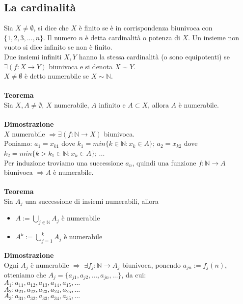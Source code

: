 \documentclass{article}
\begin{document}
\subsection{La cardinalità}
Sia $X \neq \emptyset$, si dice che $X$ è finito se è in corrispondenza biunivoca con $\{1, 2, 3, ..., n\}$. Il numero $n$ è detta cardinalità o potenza di $X$. Un insieme non vuoto si dice infinito se non è finito.\\
Due insiemi infiniti $X,Y$ hanno la stessa cardinalità (o sono equipotenti) se $\exists (f: X \rightarrow Y)$ biunivoca e si denota $X \sim Y$.\\
$X \neq \emptyset$ è detto numerabile se $X \sim \mathds{N}$.\\\\
\textbf{Teorema}\\
Sia $X,A \neq \emptyset$, $X$ numerabile, $A$ infinito e $A \subset X$, allora $A$ è numerabile.\\\\
\textbf{Dimostrazione}\\
$X$ numerabile $\Rightarrow \exists (f: \mathds{N} \rightarrow X)$ biunivoca.\\
Poniamo: $a_1 = x_{k1}$ dove $k_1 = min\{k \in \mathds{N}: x_k \in A\}$; $a_2 = x_{k2}$ dove $k_2 = min\{k>k_1 \in \mathds{N}: x_k \in A\}$; ...\\
Per induzione troviamo una successione $a_n$, quindi una funzione $f: \mathds{N} \rightarrow A$ biunivoca $\Rightarrow A$ è numerabile.\\
\\
\textbf{Teorema}\\
Sia $A_j$ una successione di insiemi numerabili, allora \begin{itemize}
    \item $A:= \bigcup_{j \in \mathds{N}} A_j$ è numerabile
    \item $A^k:= \bigcup_{j = 1} ^k A_j$ è numerabile
\end{itemize}
\textbf{Dimostrazione}\\
Ogni $A_j$ è numerabile $\Rightarrow$ $\exists f_j: \mathds{N} \rightarrow A_j$ biunivoca, ponendo $a_{jn} := f_j(n)$, otteniamo che $A_j = \{a_{j1}, a_{j2}, ..., a_{jn}, ...\}$, da cui:\\
$A_1: a_{11}, a_{12}, a_{13}, a_{14}, a_{15}, ...$\\
$A_2: a_{21}, a_{22}, a_{23}, a_{24}, a_{25}, ...$\\
$A_3: a_{31}, a_{32}, a_{33}, a_{34}, a_{35}, ...$\\
\end{document}
